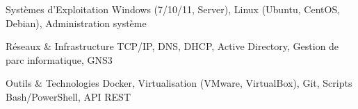 
\begin{cvskills}

  \cvskill
  {Systèmes d'Exploitation} %
  {Windows (7/10/11, Server), Linux (Ubuntu, CentOS, Debian), Administration système} %


  \cvskill
  {Réseaux \& Infrastructure} %
  {TCP/IP, DNS, DHCP, Active Directory, Gestion de parc informatique, GNS3} %


  \cvskill
  {Outils \& Technologies} %
  {Docker, Virtualisation (VMware, VirtualBox), Git, Scripts Bash/PowerShell, API REST} %

\end{cvskills}